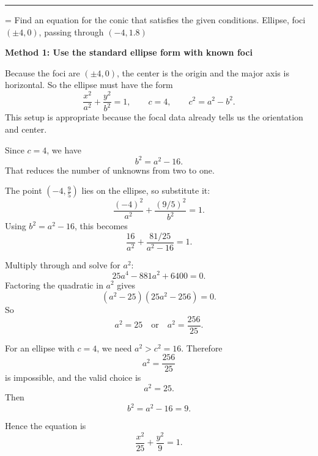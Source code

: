 \documentclass[a4paper,12pt,twocolumn]{article}
\newlength{\problemnumberwidth}
\newenvironment{solutionbox}{\begin{framed}}{\end{framed}}
\newcommand{\sectiontitle}[2]{%
  \hypertarget{#1}{}%
  \par\vspace{0.8em}%
  \noindent{\Large\bfseries #2}\par
  \vspace{0.3em}%
  \hrule
  \vspace{0.8em}%
}
\newcommand{\problem}[3]{%
  \Needspace{10\baselineskip}%
  \phantomsection\label{#1}%
  \par\vspace{0.8em}%
  \noindent
  \hangindent=\problemnumberwidth
  \hangafter=1
  \makebox[\problemnumberwidth][l]{\textbf{#2.}}#3\par
}
\begin{document}
\sectiontitle{sec:10-5}{10-5}

\problem{prob:10-5-44}{44}{Find an equation for the conic that satisfies the given conditions.
\medskip
\noindent Ellipse, foci \((\pm4,0)\), passing through \((-4,1.8)\)}

\begin{solutionbox}
\textbf{Method 1: Use the standard ellipse form with known foci}

\begin{steps}
\item Because the foci are \((\pm4,0)\), the center is the origin and the major axis is horizontal. So the ellipse must have the form
\[
\frac{x^2}{a^2}+\frac{y^2}{b^2}=1,
\qquad c=4,
\qquad c^2=a^2-b^2.
\]
This setup is appropriate because the focal data already tells us the orientation and center.

\item Since \(c=4\), we have
\[
b^2=a^2-16.
\]
That reduces the number of unknowns from two to one.

\item The point \(\left(-4,\frac95\right)\) lies on the ellipse, so substitute it:
\[
\frac{(-4)^2}{a^2}+\frac{(9/5)^2}{b^2}=1.
\]
Using \(b^2=a^2-16\), this becomes
\[
\frac{16}{a^2}+\frac{81/25}{a^2-16}=1.
\]

\item Multiply through and solve for \(a^2\):
\[
25a^4-881a^2+6400=0.
\]
Factoring the quadratic in \(a^2\) gives
\[
\left(a^2-25\right)\left(25a^2-256\right)=0.
\]
So
\[
a^2=25 \quad\text{or}\quad a^2=\frac{256}{25}.
\]

\item For an ellipse with \(c=4\), we need \(a^2>c^2=16\). Therefore
\[
a^2=\frac{256}{25}
\]
is impossible, and the valid choice is
\[
a^2=25.
\]
Then
\[
b^2=a^2-16=9.
\]

\item Hence the equation is
\[
\boxed{\frac{x^2}{25}+\frac{y^2}{9}=1.}
\]
\end{steps}
\end{solutionbox}
\end{document}
